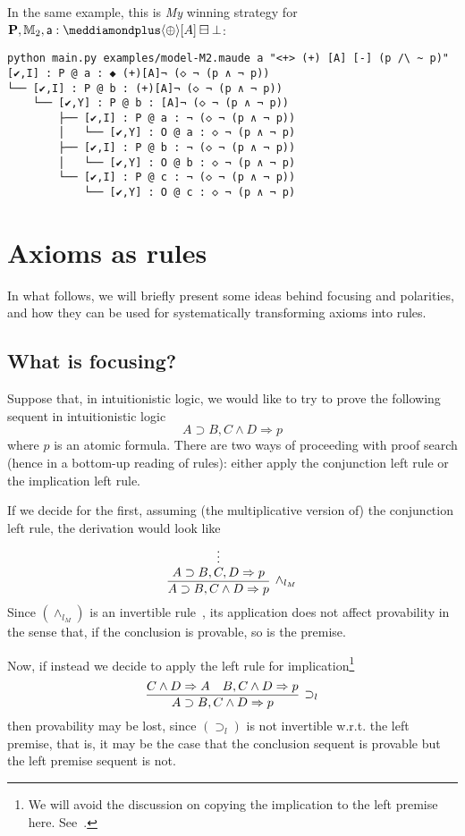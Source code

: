 \documentclass{easychair}
\newcommand{\My}{\emph{My}\xspace}
\newcommand{\seq}{\Rightarrow}
\newcommand{\ag}{\mathsf{a}}
\newcommand{\pnlOP}{\langle\oplus\rangle}
\newcommand{\dplus}{\meddiamondplus}
\newcommand{\bminus}{\boxminus}
\newcommand{\bbM}{\mathbb{M}}
\newcommand{\bfP}{\mathbf{P}}
\newcommand{\iimp}{\supset}
\begin{document}
In the same example, this is \My winning strategy for 
    $\bfP, \bbM_2,\ag : \dplus \pnlOP [A] \bminus\bot$:

\begin{Verbatim}[fontsize=\scriptsize]
python main.py examples/model-M2.maude a "<+> (+) [A] [-] (p /\ ~ p)"
[✔,I] : P @ a : ◆ (+)[A]¬ (◇ ¬ (p ∧ ¬ p))
└── [✔,I] : P @ b : (+)[A]¬ (◇ ¬ (p ∧ ¬ p))
    └── [✔,Y] : P @ b : [A]¬ (◇ ¬ (p ∧ ¬ p))
        ├── [✔,I] : P @ a : ¬ (◇ ¬ (p ∧ ¬ p))
        │   └── [✔,Y] : O @ a : ◇ ¬ (p ∧ ¬ p)
        ├── [✔,I] : P @ b : ¬ (◇ ¬ (p ∧ ¬ p))
        │   └── [✔,Y] : O @ b : ◇ ¬ (p ∧ ¬ p)
        └── [✔,I] : P @ c : ¬ (◇ ¬ (p ∧ ¬ p))
            └── [✔,Y] : O @ c : ◇ ¬ (p ∧ ¬ p)
\end{Verbatim}
 

\section{Axioms as rules}\label{app:focusing}

In what follows, we will briefly present some ideas behind focusing and polarities, and how they can be used for systematically transforming axioms into rules.

\subsection{What is focusing?}
Suppose that, in intuitionistic logic, we would like to try to prove the following sequent in intuitionistic logic
\[
A\iimp B, C\wedge D\seq p
\]
where $p$ is an atomic formula. There are two ways of proceeding with proof search (hence in a bottom-up reading of rules): either apply the conjunction left rule or the implication left rule.


If we decide for the first, assuming (the multiplicative version of) the conjunction left rule, the derivation would look like
\[
\infer[\wedge_{l_M}]{A\iimp B, C\wedge D\seq p}
{\deduce{A\iimp B, C, D\seq p}{
\deduce{}{\vdots}}}
\] 
Since $(\wedge_{l_M})$ is an invertible rule~\cite{troelstra00book}, its application does not affect provability in the sense that, if the conclusion is provable, so is the premise.

Now, if instead we decide to apply the left rule for implication\footnote{We will avoid the discussion on copying the  implication to the left premise here. See~\cite{DBLP:journals/jsyml/Dyckhoff92}.}
\[
\infer[\iimp_{l}]{A\iimp B, C\wedge D\seq p}{C\wedge D\seq A & B, C\wedge D\seq p}
\] 
then provability may be lost, since $(\iimp_{l})$ is not invertible w.r.t. the left premise, that is, it may be the case that the conclusion sequent is provable but the left premise sequent is not.
\end{document}
